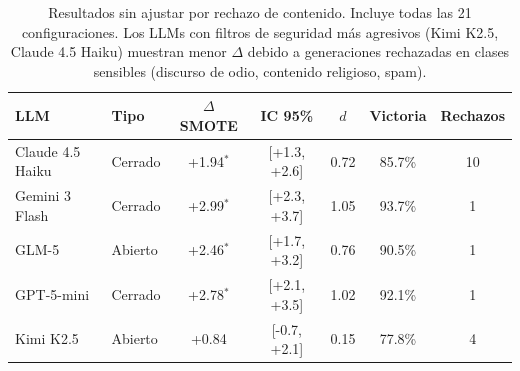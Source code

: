 \begin{table}[htbp]
\centering
\small
\caption{Resultados sin ajustar por rechazo de contenido. Incluye todas las 21 configuraciones. Los LLMs con filtros de seguridad m\'as agresivos (Kimi K2.5, Claude 4.5 Haiku) muestran menor $\Delta$ debido a generaciones rechazadas en clases sensibles (discurso de odio, contenido religioso, spam).}
\label{tab:multi_llm_raw}
\begin{tabular}{llccccc}
\toprule
\textbf{LLM} & \textbf{Tipo} & \textbf{$\Delta$ SMOTE} & \textbf{IC 95\%} & \textbf{$d$} & \textbf{Victoria} & \textbf{Rechazos} \\
\midrule
Claude 4.5 Haiku & Cerrado & +1.94$^{*}$ & [+1.3, +2.6] & 0.72 & 85.7\% & 10 \\
Gemini 3 Flash & Cerrado & +2.99$^{*}$ & [+2.3, +3.7] & 1.05 & 93.7\% & 1 \\
GLM-5 & Abierto & +2.46$^{*}$ & [+1.7, +3.2] & 0.76 & 90.5\% & 1 \\
GPT-5-mini & Cerrado & +2.78$^{*}$ & [+2.1, +3.5] & 1.02 & 92.1\% & 1 \\
Kimi K2.5 & Abierto & +0.84 & [-0.7, +2.1] & 0.15 & 77.8\% & 4 \\
\bottomrule
\end{tabular}
\end{table}